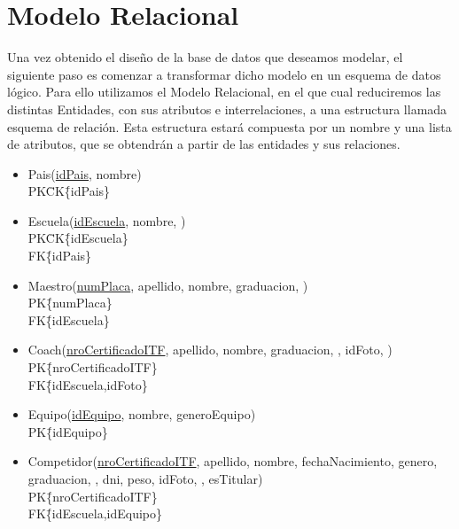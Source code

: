 \newpage
\section{Modelo Relacional}

Una vez obtenido el diseño de la base de datos que deseamos modelar, el siguiente paso es comenzar a transformar dicho modelo en un esquema de datos lógico. Para ello utilizamos el Modelo Relacional, en el que cual reduciremos las distintas Entidades, con sus atributos e interrelaciones, a una estructura llamada esquema de relación. Esta estructura estará compuesta por un nombre y una lista de atributos, que se obtendrán a partir de las entidades y sus relaciones.

\begin{itemize}

\item{Pais(\underline{idPais}, nombre)\\
PK\=CK\=\{idPais\}}

\item{Escuela(\underline{idEscuela}, nombre, )\\
PK\=CK\=\{idEscuela\}\\
FK\=\{idPais\}
}

\item{Maestro(\underline{numPlaca}, apellido, nombre, graduacion, )\\
PK\=\{numPlaca\} \\
FK\=\{idEscuela\} \\
}

\item{Coach(\underline{nroCertificadoITF}, apellido, nombre, graduacion, , idFoto, )\\
PK\=\{nroCertificadoITF\} \\
FK\=\{idEscuela,idFoto\} \\
}

\item{Equipo(\underline{idEquipo}, nombre, generoEquipo)\\
PK\=\{idEquipo\} \\
}

\item{Competidor(\underline{nroCertificadoITF}, apellido, nombre, fechaNacimiento, genero, graduacion, , dni, peso, idFoto, , esTitular) \\
PK\=\{nroCertificadoITF\} \\
FK\=\{idEscuela,idEquipo\}
}


\end{itemize}
